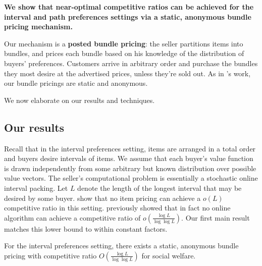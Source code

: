 \vspace{0.15in}

\parbox[c]{0.95\textwidth}{{\bf We show that near-optimal
    competitive ratios can be achieved for the interval and path
    preferences settings via a static, anonymous bundle pricing
    mechanism. }}

\vspace{0.15in}

Our mechanism is a {\bf posted bundle pricing}: the seller partitions
items into bundles, and prices each bundle based on his knowledge of
the distribution of buyers' preferences. Customers arrive in arbitrary
order and purchase the bundles they most desire at the advertised
prices, unless they're sold out. As in \citeauthor{FGL15}'s work, our
bundle pricings are static and anonymous.

We now elaborate on our results and techniques.

\subsection{Our results}

Recall that in the interval preferences setting, items are arranged in
a total order and buyers desire intervals of items. We assume that
each buyer's value function is drawn independently from some arbitrary
but known distribution over possible value vectors. The seller's
computational problem is essentially a stochastic online interval
packing. Let $L$ denote the length of the longest interval that may be
desired by some buyer. \citet{FGL15} show that no item pricing can
achieve a $o(L)$ competitive ratio in this
setting. \citet{im2011secretary} previously showed that in fact no
online algorithm can achieve a competitive ratio of
$o\left(\frac{\log L}{\log\log L}\right)$. Our first main result matches this
lower bound to within constant factors.

\begin{theorem}
\label{thm:unit-cap-ub}
For the interval preferences setting, there exists a static, anonymous bundle
pricing with competitive ratio $O\left(\frac{\log L}{\log\log
    L}\right)$ for social welfare.
\end{theorem}

